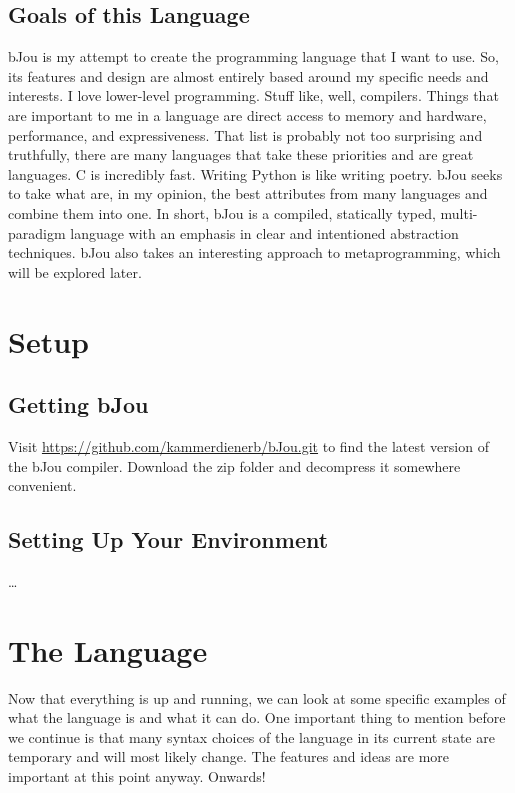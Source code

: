 \documentclass[12pt]{article}
\begin{document}
	\subsection*{Goals of this Language}
		bJou is my attempt to create the programming language that I want to use. So, its features and design are almost entirely based around my specific needs and interests. I love lower-level programming. Stuff like, well, compilers. Things that are important to me in a language are direct access to memory and hardware, performance, and expressiveness. That list is probably not too surprising and truthfully, there are many languages that take these priorities and are great languages. C is incredibly fast. Writing Python is like writing poetry. bJou seeks to take what are, in my opinion, the best attributes from many languages and combine them into one. In short, bJou is a compiled, statically typed, multi-paradigm language with an emphasis in clear and intentioned abstraction techniques. bJou also takes an interesting approach to metaprogramming, which will be explored later.

\newpage
{}
\section*{Setup}

	\subsection*{Getting bJou}
	Visit \url{https://github.com/kammerdienerb/bJou.git} to find the latest version of the bJou compiler. Download the zip folder and decompress it somewhere convenient.
	
	\subsection*{Setting Up Your Environment}
		\ldots

\newpage
{}
\section*{The Language}

	Now that everything is up and running, we can look at some specific examples of what the language is and what it can do. One important thing to mention before we continue is that many syntax choices of the language in its current state are temporary and will most likely change. The features and ideas are more important at this point anyway. Onwards!
	
\end{document}
